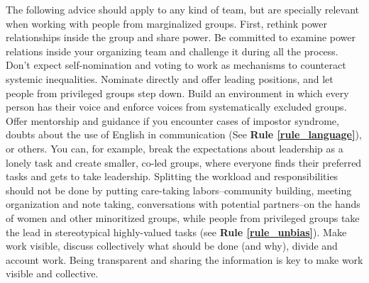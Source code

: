 \documentclass[10pt,letterpaper]{article}
\begin{document}
The following advice should apply to any kind of team, but are specially relevant when working with people from marginalized groups. First, rethink power relationships inside the group and share power. Be committed to examine power relations inside your organizing team and challenge it during all the process. %
Don't expect self-nomination and voting to work as mechanisms to counteract systemic inequalities. Nominate directly and offer leading positions, and let people from privileged groups step down. 
Build an environment in which every person has their voice and enforce voices from systematically excluded groups.
Offer mentorship and guidance if you encounter cases of impostor syndrome, doubts about the use of English in communication (See \textbf{Rule \ref{rule_language}}), or others. You can, for example, break the expectations about leadership as a lonely task and create smaller, co-led groups, where everyone finds their preferred tasks and gets to take leadership. Splitting the workload and responsibilities should not be done by putting care-taking labors--community building, meeting organization and note taking, conversations with potential partners--on the hands of women and other minoritized groups, while people from privileged groups take the lead in stereotypical highly-valued tasks (see \textbf{Rule \ref{rule_unbias}}). Make work visible, discuss collectively what should be done (and why), divide and account work. Being transparent and sharing the information is key to make work visible and collective. %

\end{document}
